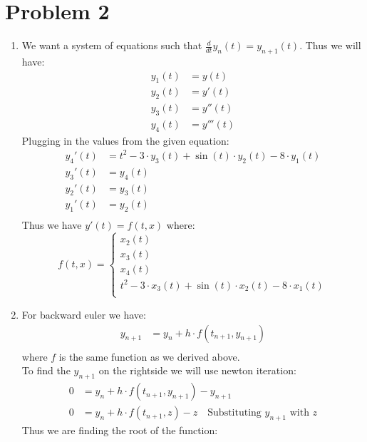 \documentclass{article}
\begin{document}
\section*{Problem 2}
\begin{enumerate}
\item We want a system of equations such that $\frac{d}{dt}y_n(t) = y_{n+1}(t)$. Thus we will have: \\
\begin{align*}
y_1(t) &= y(t) \\
y_2(t) &= y'(t) \\
y_3(t) &= y''(t) \\
y_4(t) &= y'''(t)
\end{align*}
Plugging in the values from the given equation: \\
\begin{align*}
y_4'(t) &= t^2 - 3 \cdot y_3(t) + \sin (t) \cdot y_2(t) - 8 \cdot y_1(t) \\
y_3'(t)  &= y_4(t) \\
y_2'(t) &= y_3(t) \\
y_1'(t) &= y_2(t)\\
\end{align*}
Thus we have $y'(t) = f(t, x)$ where: \\
\[
f(t,x) =
\begin{cases}
x_2(t) \\
x_3(t) \\
x_4(t) \\
t^2 - 3 \cdot x_3(t) + \sin (t) \cdot x_2(t) - 8 \cdot x_1(t) \\
\end{cases} 
\]
\item For backward euler we have: \\
\begin{align*}
y_{n+1} &= y_n + h \cdot f(t_{n+1}, y_{n+1})\\
\end{align*}
where $f$ is the same function as we derived above. \\
To find the $y_{n+1}$ on the rightside we will use newton iteration: \\
\begin{align*}
0 &= y_n + h \cdot f(t_{n+1}, y_{n+1}) - y_{n+1} \\
0 &= y_n + h \cdot f(t_{n+1}, z) - z \quad \mbox{Substituting $y_{n+1}$ with $z$}
\end{align*}
Thus we are finding the root of the function: \\
\begin{align*}

\end{align*}
\end{enumerate}
\end{document}
